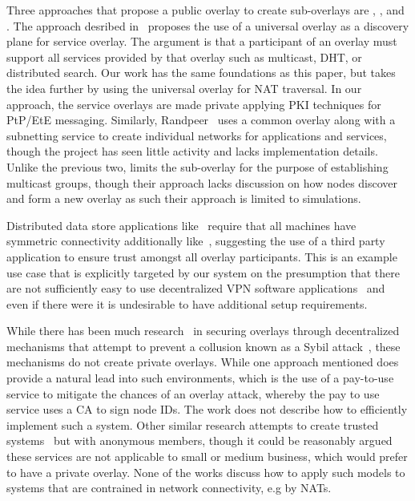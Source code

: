\documentclass[conference]{IEEEtran}
\begin{document}
Three approaches that propose a public overlay to create sub-overlays are
\cite{one_ring}, \cite{randpeer}, and \cite{can_multicast}.
The approach desribed in~\cite{one_ring} proposes the use of a universal overlay as a discovery plane for
service overlay.  The argument is that a participant of an overlay
must support all services provided by that overlay such as multicast, DHT,
or distributed search.  Our work has the same foundations as this paper, but
takes the idea further by using the universal overlay for NAT traversal.
In our approach, the service overlays are made private applying PKI techniques for PtP/EtE messaging.
Similarly, Randpeer~\cite{randpeer} uses a common overlay along with a
subnetting service to create individual networks for applications and services,
though the project has seen little activity and lacks implementation details.
Unlike the previous two, \cite{can_multicast} limits the sub-overlay for the
purpose of establishing multicast groups, though their approach lacks discussion
on how nodes discover and form a new overlay as such their approach is limited
to simulations.

Distributed data store applications like~\cite{dynamo, bigtable} require that
all machines have symmetric connectivity additionally like~\cite{past}, suggesting
the use of a third party application to ensure trust amongst all overlay
participants.  This is an example use case that is explicitly targeted by our
system on the presumption that there are not sufficiently easy to use
decentralized VPN software applications~\cite{sc09, nsdi10} and even if there
were it is undesirable to have additional setup requirements.

While there has been much research~\cite{secure_routing} in securing overlays
through decentralized mechanisms that attempt to prevent a collusion known as
a Sybil attack~\cite{sybil}, these mechanisms do not create private overlays.
While one approach mentioned does provide a natural lead into such
environments, which is the use of a pay-to-use service to mitigate the chances
of an overlay attack, whereby the pay to use service uses a CA to sign node
IDs.  The work does not describe how to efficiently implement such a system.
Other similar research attempts to create trusted systems~\cite{stone, tor} but
with anonymous members, though it could be reasonably argued these services are
not applicable to small or medium business, which would prefer to have a private
overlay.  None of the works discuss how to apply such models to
systems that are contrained in network connectivity, e.g by NATs.
\end{document}
